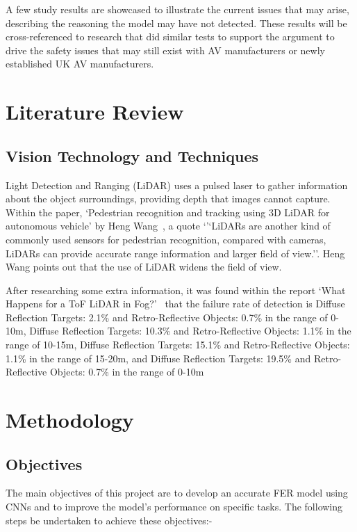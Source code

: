 \documentclass[conference]{IEEEtran}
\begin{document}
	A few study results are showcased to illustrate the current issues that may arise, describing the reasoning the model may have not detected. These results will be cross-referenced to research that did similar tests to support the argument to drive the safety issues that may still exist with AV manufacturers or newly established UK AV manufacturers.

\section{Literature Review}
	\subsection{Vision Technology and Techniques}
		Light Detection and Ranging (LiDAR) uses a pulsed laser to gather information about the object surroundings, providing depth that images cannot capture. Within the paper, `Pedestrian recognition and tracking using 3D LiDAR for autonomous vehicle' by Heng Wang~\cite{wang_pedestrian_2017}, a quote `'`LiDARs are another kind of commonly used sensors for pedestrian recognition, compared with cameras, LiDARs can provide accurate range information and larger field of view.''. Heng Wang points out that the use of LiDAR widens the field of view.
		
		After researching some extra information, it was found within the report `What Happens for a ToF LiDAR in Fog?'~\cite{li_what_2021} that the failure rate of detection is Diffuse Reflection Targets: 2.1\% and Retro-Reflective Objects: 0.7\% in the range of 0-10m, Diffuse Reflection Targets: 10.3\% and Retro-Reflective Objects: 1.1\% in the range of 10-15m, Diffuse Reflection Targets: 15.1\% and Retro-Reflective Objects: 1.1\% in the range of 15-20m, and Diffuse Reflection Targets: 19.5\% and Retro-Reflective Objects: 0.7\% in the range of 0-10m~\cite{royo_overview_2019}

\section{Methodology}
	\subsection{Objectives}
	The main objectives of this project are to develop an accurate FER model using CNNs and to improve the model's performance on specific tasks. The following steps be undertaken to achieve these objectives:-
\end{document}
